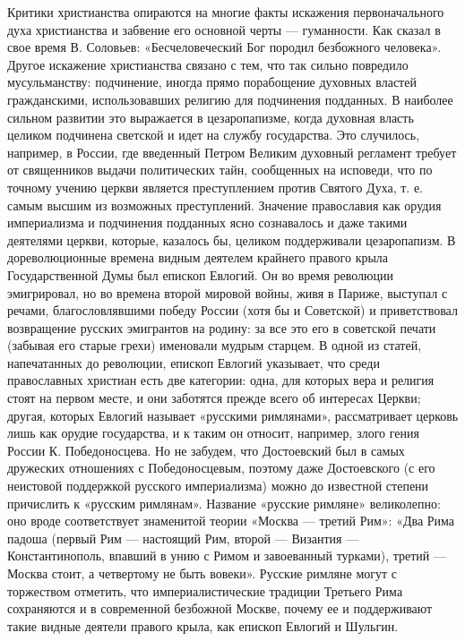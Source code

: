 Критики   христианства    опираются   на   многие    факты   искажения
первоначального духа  христианства и  забвение его основной  черты ---
гуманности. Как сказал в свое  время В. Соловьев: «Бесчеловеческий Бог
породил безбожного человека». Другое  искажение христианства связано с
тем, что так сильно  повредило мусульманству: подчинение, иногда прямо
порабощение духовных властей  гражданскими, использовавших религию для
подчинения  подданных. В  наиболее сильном  развитии это  выражается в
цезаропапизме,  когда духовная  власть  целиком  подчинена светской  и
идет на  службу государства.  Это случилось,  например, в  России, где
введенный  Петром Великим  духовный регламент  требует от  священников
выдачи  политических  тайн, сообщенных  на  исповеди,  что по  точному
учению  церкви  является  преступлением  против Святого  Духа,  т.  е.
самым  высшим  из  возможных преступлений.  Значение  православия  как
орудия  империализма и  подчинения подданных  ясно сознавалось  и даже
такими деятелями  церкви, которые,  казалось бы,  целиком поддерживали
цезаропапизм.  В  дореволюционные  времена  видным  деятелем  крайнего
правого крыла  Государственной Думы был  епископ Евлогий. Он  во время
революции  эмигрировал, но  во времена  второй мировой  войны, живя  в
Париже,  выступал  с  речами,  благословлявшими  победу  России  (хотя
бы  и Советской)  и  приветствовал возвращение  русских эмигрантов  на
родину:  за  все  это  его  в советской  печати  (забывая  его  старые
грехи) именовали  мудрым старцем. В  одной из статей,  напечатанных до
революции, епископ Евлогий указывает,  что среди православных христиан
есть две категории:  одна, для которых вера и религия  стоят на первом
месте,  и они  заботятся  прежде всего  об  интересах Церкви;  другая,
которых Евлогий  называет «русскими римлянами»,  рассматривает церковь
лишь как  орудие государства,  и к таким  он относит,  например, злого
гения России  К. Победоносцева. Но  не забудем, что Достоевский  был в
самых дружеских отношениях с Победоносцевым, поэтому даже Достоевского
(с его неистовой поддержкой  русского империализма) можно до известной
степени причислить  к «русским  римлянам». Название  «русские римляне»
великолепно:  оно вроде  соответствует знаменитой  теории «Москва  ---
третий Рим»:  «Два Рима падоша  (первый Рим --- настоящий  Рим, второй
--- Византия --- Константинополь, впавший в унию с Римом и завоеванный
турками),  третий ---  Москва  стоит, а  четвертому  не быть  вовеки».
Русские римляне  могут с  торжеством отметить,  что империалистические
традиции Третьего  Рима сохраняются и в  современной безбожной Москве,
почему  ее и  поддерживают  такие видные  деятели  правого крыла,  как
епископ Евлогий и Шульгин.

